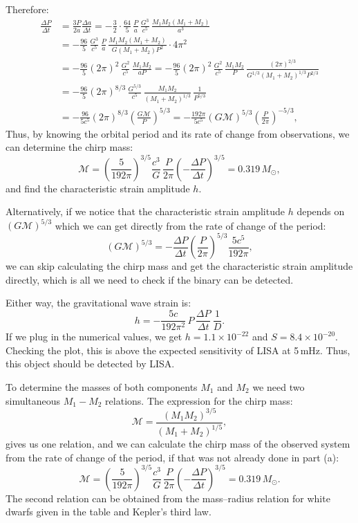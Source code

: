 \begin{description}
  Therefore:
  \begin{align*}
    \frac{\Delta P}{\Delta t}
      &= \frac{3P}{2a}\frac{\Delta a}{\Delta t}
       = -\frac{3}{2}\cdot\frac{64}{5}\,\frac{P}{a}\,\frac{G^3}{c^5}\,
         \frac{M_1 M_2 (M_1+M_2)}{a^3} \\
      &= -\frac{96}{5}\,\frac{G^3}{c^5}\,\frac{P}{a}\,
         \frac{M_1 M_2 (M_1+M_2)}{G(M_1+M_2)P^2}\cdot 4\pi^2 \\
      &= -\frac{96}{5}(2\pi)^2\,\frac{G^2}{c^5}\,\frac{M_1 M_2}{aP}
       = -\frac{96}{5}(2\pi)^2\,\frac{G^2}{c^5}\,\frac{M_1 M_2}{P}\,
         \frac{(2\pi)^{2/3}}{G^{1/3}(M_1+M_2)^{1/3}P^{2/3}} \\
      &= -\frac{96}{5}(2\pi)^{8/3}\,\frac{G^{5/3}}{c^5}\,
         \frac{M_1 M_2}{(M_1+M_2)^{1/3}}\,\frac{1}{P^{5/3}} \\
      &= -\frac{96}{5c^5}(2\pi)^{8/3}
         \left(\frac{G\mathcal{M}}{P}\right)^{5/3}
       = -\frac{192\pi}{5c^5}(G\mathcal{M})^{5/3}
         \left(\frac{P}{2\pi}\right)^{-5/3},
  \end{align*}
  Thus, by knowing the orbital period and its rate of change from
  observations, we can determine the chirp mass:
  \[ \mathcal{M} = \left(\frac{5}{192\pi}\right)^{3/5}\frac{c^3}{G}\,
     \frac{P}{2\pi}\left(-\frac{\Delta P}{\Delta t}\right)^{3/5}
     = 0.319\,M_\odot, \]
  and find the characteristic strain amplitude $h$.

  Alternatively, if we notice that the characteristic strain amplitude $h$
  depends on $(G\mathcal{M})^{5/3}$ which we can get directly from the rate of
  change of the period:
  \[ (G\mathcal{M})^{5/3} = -\frac{\Delta P}{\Delta t}
     \left(\frac{P}{2\pi}\right)^{5/3}\frac{5c^5}{192\pi}, \]
  we can skip calculating the chirp mass and get the characteristic strain
  amplitude directly, which is all we need to check if the binary can be
  detected.

  Either way, the gravitational wave strain is:
  \[ h = -\frac{5c}{192\pi^2}\,P\,\frac{\Delta P}{\Delta t}\,\frac{1}{D}. \]
  If we plug in the numerical values, we get $h = 1.1 \times 10^{-22}$ and
  $S = 8.4 \times 10^{-20}$. Checking the plot, this is above the expected
  sensitivity of LISA at 5\,mHz. Thus, this object should be detected by LISA.

\item[Part (b)] To determine the masses of both components $M_1$ and $M_2$ we
  need two simultaneous $M_1 - M_2$ relations. The expression for the chirp
  mass:
  \[ \mathcal{M} = \frac{(M_1 M_2)^{3/5}}{(M_1 + M_2)^{1/5}}, \]
  gives us one relation, and we can calculate the chirp mass of the observed
  system from the rate of change of the period, if that was not already done
  in part (a):
  \[ \mathcal{M} = \left(\frac{5}{192\pi}\right)^{3/5}\frac{c^3}{G}\,
     \frac{P}{2\pi}\left(-\frac{\Delta P}{\Delta t}\right)^{3/5}
     = 0.319\,M_\odot. \]
  The second relation can be obtained from the mass--radius relation for white
  dwarfs given in the table and Kepler's third law.


\end{description}
